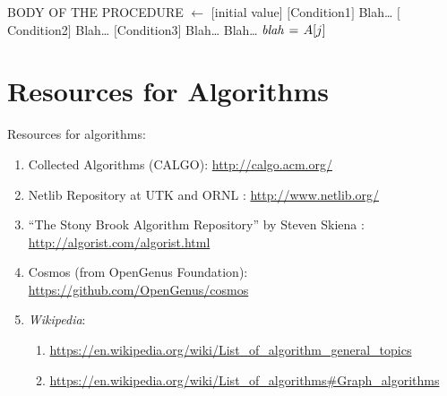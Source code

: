 \begin{codebox}
\label{lst:MyAlgorithm}
\zi {}
\zi {}
\li BODY OF THE PROCEDURE
\zi {}
\li \While [condition]
	\Do
\li	[Something]
	\End
\zi {}
\li \For {} $\gets$ [initial value] 
	\Do
\li	[Something]
	\End
\zi {}
\li	\If $[$Condition1$]$
	\Then
\li		Blah\dots
\li	\ElseIf $[$Condition2$]$
	\Then
\li		Blah\dots
\li	\ElseIf $[$Condition3$]$
	\Then
\li		Blah\dots
\li	\Else
\li		Blah\dots	
	\End
\zi {}
\li $\id{blah} \gets A[j]$
\zi	\>	
\zi	{}
\li	\Return
\end{codebox}



\section{Resources for Algorithms}
\label{sec:ResourcesForAlgorithms}

Resources for algorithms: \vspace{-0.3cm}
\begin{enumerate} \itemsep -4pt
\item Collected Algorithms (CALGO): \url{http://calgo.acm.org/}
\item Netlib Repository at UTK and ORNL \cite{Dongarra2016}: \url{http://www.netlib.org/}
\item ``The Stony Brook Algorithm Repository'' by Steven Skiena \cite{Skiena2008}: \url{http://algorist.com/algorist.html}
\item Cosmos (from OpenGenus Foundation): \url{https://github.com/OpenGenus/cosmos}
\item {\it Wikipedia}: \vspace{-0.3cm}
	\begin{enumerate} \itemsep -2pt
	\item \url{https://en.wikipedia.org/wiki/List_of_algorithm_general_topics}
	\item \url{https://en.wikipedia.org/wiki/List_of_algorithms#Graph_algorithms}
	\end{enumerate}
\end{enumerate}











